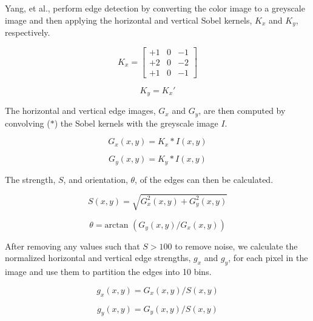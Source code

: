 \documentclass[11pt]{article}
\begin{document}
Yang, et al., \cite{hybrid} perform edge detection by converting the color image to a greyscale image and then applying the horizontal and vertical Sobel kernels, $K_x$ and $K_y$, respectively.

\begin{equation}
K_x = \left [ \begin{array}{ccc}
+1 & 0 & -1 \\
+2 & 0 & -2 \\
+1 & 0 & -1 \end{array} \right ] 
\label{eq:horzsobel}
\end{equation}

\begin{equation}
K_y = K_x'
\label{eq:vertsobel}
\end{equation}

The horizontal and vertical edge images, $G_x$ and $G_y$, are then computed by convolving ($*$) the Sobel kernels with the greyscale image $I$.

\begin{equation}
G_x(x,y) = K_x * I(x,y)
\label{eq:horzedgeimg}
\end{equation}

\begin{equation}
G_y(x,y) = K_y * I(x,y)
\label{eq:vertedgeimg}
\end{equation}

The strength, $S$, and orientation, $\theta$, of the edges can then be calculated.

\begin{equation}
S(x,y) = \sqrt{G_x^2(x,y) + G_y^2(x,y)}
\label{eq:edgestrength}
\end{equation}

\begin{equation}
\theta = \text{arctan } (G_y(x,y) / G_x(x,y))
\label{eq:edgeorient}
\end{equation}

After removing any values such that $S > 100$  to remove noise, we calculate the normalized horizontal and vertical edge strengths, $g_x$ and $g_y$, for each pixel in the image and use them to partition the edges into 10 bins.

\begin{equation}
g_x(x,y) = G_x(x,y)/S(x,y)
\label{eq:horznormedgestrength}
\end{equation}

\begin{equation}
g_y(x,y) = G_y(x,y)/S(x,y)
\label{eq:vertnormedgestrength}
\end{equation}
\end{document}
